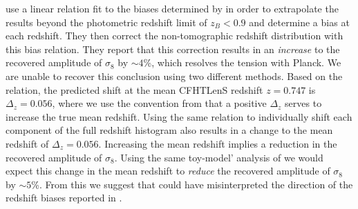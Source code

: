 \cite{kitching/etal:2016} use a linear relation fit to the biases determined by \citet{choi/etal:2016} in order to extrapolate the results beyond the photometric redshift limit of $z_B<0.9$ and determine a bias at each redshift.  They then correct the non-tomographic \citet{kilbinger/etal:2013} redshift distribution with this bias relation.  They report that this correction results in an {\it increase} to the recovered amplitude of $\sigma_8$ by $\sim 4$\%, which resolves the tension with Planck.   We are unable to recover this conclusion using two different methods.   Based on the \cite{kitching/etal:2016} relation, the predicted shift at the mean CFHTLenS redshift $z=0.747$ is $\Delta_z = 0.056$, where we use the convention from \citet{choi/etal:2016} that a positive $\Delta_z$ serves to increase the true mean redshift.  Using the same relation to individually shift each component of the full \citet{kilbinger/etal:2013} redshift histogram also results in a change to the mean redshift of $\Delta_z = 0.056$.  Increasing the mean redshift implies a reduction in the recovered amplitude of $\sigma_8$.  Using the same toy-model' analysis of \citet{choi/etal:2016} we would expect this change in the mean redshift to {\it reduce} the recovered amplitude of $\sigma_8$ by $\sim 5$\%.    From this we suggest that \cite{kitching/etal:2016} could have misinterpreted the direction of the redshift biases reported in \citet{choi/etal:2016}. 



 